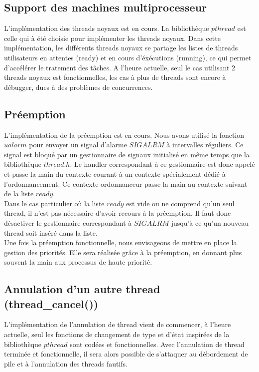 \subsection{Support des machines multiprocesseur}
L'implémentation des threads noyaux est en cours. La bibliothèque $pthread$ est celle qui à été choisie pour implémenter les threads noyaux. Dans cette implémentation, les différents threads noyaux se partage les listes de threads utilisateurs en attentes (ready) et en cours d'éxécutions (running), ce qui permet d'accélérer le tratement des tâches.
\indent A l'heure actuelle, seul le cas utilisant 2 threads noyaux est fonctionnelles, les cas à plus de threads sont encore à débugger, dues à des problèmes de concurrences.

\subsection{Préemption}
L'implémentation de la préemption est en cours. Nous avons utilisé la fonction $ualarm$ pour envoyer un signal d'alarme $SIGALRM$ à intervalles réguliers. Ce signal est bloqué par un gestionnaire de signaux initialisé en même temps que la bibliothèque $thread.h$. Le handler correspondant à ce gestionnaire est donc appelé et passe la main du contexte courant à un contexte spécialement dédié à l'ordonnancement. Ce contexte ordonnanceur passe la main au contexte suivant de la liste $ready$.\\
\indent Dans le cas particulier où la liste $ready$ est vide ou ne comprend qu'un seul thread, il n'est pas nécessaire d'avoir recours à la préemption. Il faut donc désactiver le gestionnaire correspondant à $SIGALRM$ jusqu'à ce qu'un nouveau thread soit inséré dans la liste.\\
\indent Une fois la préemption fonctionnelle, nous envisageons de mettre en place la gestion des priorités. Elle sera réalisée grâce à la préemption, en donnant plus souvent la main aux processus de haute priorité.
 
\subsection{Annulation d'un autre thread (thread\_cancel())}
L'implémentation de l'annulation de thread vient de commencer, à l'heure actuelle, seul les fonctions de changement de type et d'état inspirées de la bibliothèque $pthread$ sont codées et fonctionnelles.
\indent Avec l'annulation de thread terminée et fonctionnelle, il sera alors possible de s'attaquer au débordement de pile et à l'annulation des threads fautifs.
